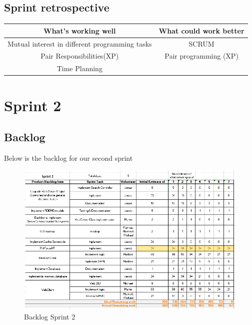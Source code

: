 \subsection{Sprint retrospective}

\begin{center}
\begin{tabular}{|c|c|}
\hline \textbf{What's working well} & \textbf{What could work better} \\ 
\hline Mutual interest in different programming tasks & SCRUM \\ 
Pair Responsibilities(XP) & Pair programming (XP) \\ 
 Time Planning &  \\ 
\hline 
\end{tabular} 
\end{center}



\newpage
\section{Sprint 2}
\label{chap:Spring 2}

\subsection{Backlog}
Below is the backlog for our second sprint
\begin{figure}[h]
\begin{center}
\includegraphics[scale=0.6]{img/SCRUM/backlogSprint2.png}
\caption{Backlog Sprint 2}
\label{fig:Backlog Sprint 2}
\end{center}
\end{figure}

